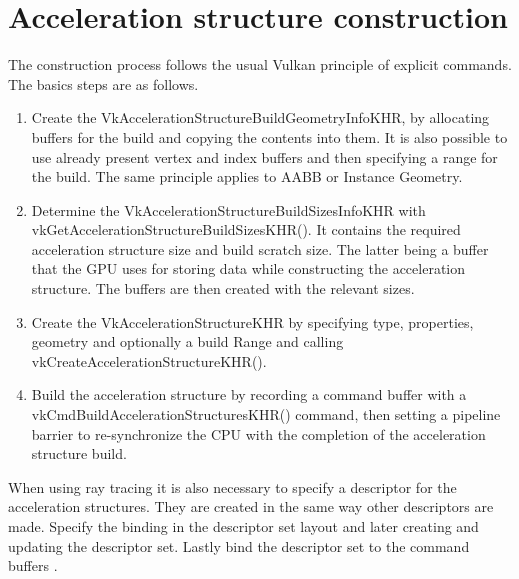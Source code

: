 \section{Acceleration structure construction}
\label{sec:VkASBuild}
The construction process follows the usual Vulkan principle of explicit commands. The basics steps are as follows.
\begin{enumerate}
    \item Create the VkAccelerationStructureBuildGeometryInfoKHR, by allocating buffers for the build and copying the contents into them. It is also possible to use already present vertex and index buffers and then specifying a range for the build. The same principle applies to AABB or Instance Geometry.
    \item Determine the VkAccelerationStructureBuildSizesInfoKHR with vkGetAccelerationStructureBuildSizesKHR(). It contains the required acceleration structure size and build scratch size. The latter being a buffer that the GPU uses for storing data while constructing the acceleration structure. The buffers are then created with the relevant sizes.
    \item Create the VkAccelerationStructureKHR by specifying type, properties, geometry and optionally a build Range and calling vkCreateAccelerationStructureKHR().
    \item Build the acceleration structure by recording a command buffer with a vkCmdBuildAccelerationStructuresKHR() command, then setting a pipeline barrier to re-synchronize the CPU with the completion of the acceleration structure build.
\end{enumerate}
When using ray tracing it is also necessary to specify a descriptor for the acceleration structures. They are created in the same way other descriptors are made. Specify the binding in the descriptor set layout and later creating and updating the descriptor set. Lastly bind the descriptor set to the command buffers \cite{vulkanSpec}.
\newpage
